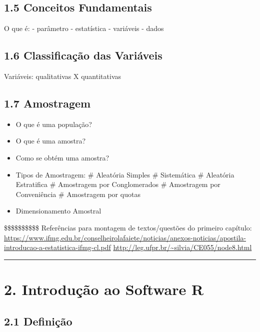 \documentclass[
]{book}
\providecommand{\tightlist}{%
  \setlength{\itemsep}{0pt}\setlength{\parskip}{0pt}}
\theoremstyle{definition}
\theoremstyle{definition}
\theoremstyle{definition}
\theoremstyle{definition}
\theoremstyle{remark}
\begin{document}
\hypertarget{conceitos-fundamentais}{%
\section{1.5 Conceitos Fundamentais}\label{conceitos-fundamentais}}

O que é:
- parâmetro
- estatística
- variáveis
- dados

\hypertarget{classificauxe7uxe3o-das-variuxe1veis}{%
\section{1.6 Classificação das Variáveis}\label{classificauxe7uxe3o-das-variuxe1veis}}

Variáveis: qualitativas X quantitativas

\hypertarget{amostragem}{%
\section{1.7 Amostragem}\label{amostragem}}

\begin{itemize}
\tightlist
\item
  O que é uma população?
\item
  O que é uma amostra?
\item
  Como se obtém uma amostra?
\item
  Tipos de Amostragem:
  \# Aleatória Simples
  \# Sistemática
  \# Aleatória Estratifica
  \# Amostragem por Conglomerados
  \# Amostragem por Conveniência
  \# Amostragem por quotas
\item
  Dimensionamento Amostral
\end{itemize}

\$\$\$\$\$\$\$\$\$\$ Referências para montagem de textos/questões do primeiro capítulo:
\url{https://www.ifmg.edu.br/conselheirolafaiete/noticias/anexos-noticias/apostila-introducao-a-estatistica-ifmg-cl.pdf}
\url{http://leg.ufpr.br/~silvia/CE055/node8.html}

\begin{center}\rule{0.5\linewidth}{0.5pt}\end{center}

\hypertarget{introduuxe7uxe3o-ao-software-r}{%
\chapter{2. Introdução ao Software R}\label{introduuxe7uxe3o-ao-software-r}}

\hypertarget{definiuxe7uxe3o-1}{%
\section{2.1 Definição}\label{definiuxe7uxe3o-1}}
\end{document}
